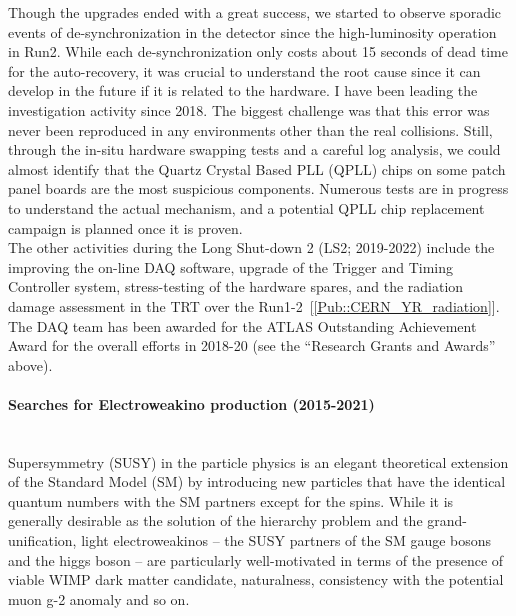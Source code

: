 \documentclass[12pt]{article}
\begin{document}
Though the upgrades ended with a great success, we started to observe sporadic events of de-synchronization in the detector since the high-luminosity operation in Run2.
While each de-synchronization only costs about 15 seconds of dead time for the auto-recovery, 
it was crucial to understand the root cause since it can develop in the future if it is related to the hardware.
I have been leading the investigation activity since 2018.
The biggest challenge was that this error was never been reproduced in any environments other than the real collisions.
Still, through the in-situ hardware swapping tests and a careful log analysis,
we could almost identify that the Quartz Crystal Based PLL (QPLL) chips on some patch panel boards are the most suspicious components.
Numerous tests are in progress to understand the actual mechanism, and a potential QPLL chip replacement campaign is planned once it is proven. \\

The other activities during the Long Shut-down 2 (LS2; 2019-2022) include the improving the on-line DAQ software, 
upgrade of the Trigger and Timing Controller system, stress-testing of the hardware spares, and the radiation damage assessment in the TRT over the Run1-2~[\ref{Pub::CERN_YR_radiation}]. 
The DAQ team has been awarded for the ATLAS Outstanding Achievement Award for the overall efforts in 2018-20 (see the ``Research Grants and Awards'' above). 

\paragraph{Searches for Electroweakino production (2015-2021)}  \phantom{k} \vspace{3mm} \\
Supersymmetry (SUSY) in the particle physics is an elegant theoretical extension of the Standard Model (SM) 
by introducing new particles that have the identical quantum numbers with the SM partners except for the spins.
While it is generally desirable as the solution of the hierarchy problem and the grand-unification,
light electroweakinos -- the SUSY partners of the SM gauge bosons and the higgs boson -- are particularly well-motivated 
in terms of the presence of viable WIMP dark matter candidate, naturalness, consistency with the potential muon g-2 anomaly and so on. \\
\end{document}
